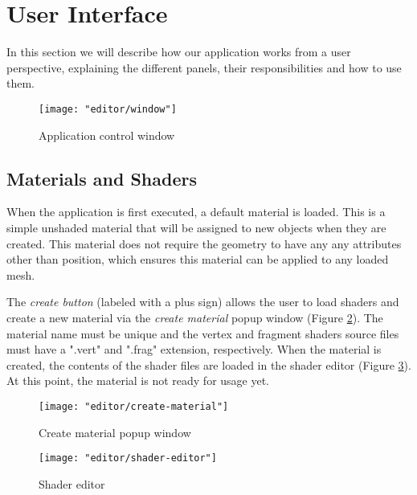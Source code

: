 \section{User Interface}
In this section we will describe how our application works from a user perspective, explaining the different panels, their responsibilities and how to use them.

\begin{figure}[ht]
    \caption{Application control window}
    \begin{center}
        \texttt{[image: "editor/window"]}
    \end{center}
    \label{fig:window}
\end{figure}


\subsection{Materials and Shaders}
When the application is first executed, a default material is loaded. This is a simple unshaded material that will be assigned to new objects when they are created. This material does not require the geometry to have any any attributes other than position, which ensures this material can be applied to any loaded mesh.

The \textit{create button} (labeled with a plus sign) allows the user to load shaders and create a new material via the \textit{create material} popup window (Figure \ref{fig:create-material}). The material name must be unique and the vertex and fragment shaders source files must have a ".vert" and ".frag" extension, respectively. When the material is created, the contents of the shader files are loaded in the shader editor (Figure \ref{fig:shader-editor}). At this point, the material is not ready for usage yet.

\begin{figure}[h]
    \caption{Create material popup window}
    \begin{center}
        \texttt{[image: "editor/create-material"]}
    \end{center}
    \label{fig:create-material}
\end{figure}

\begin{figure}
    \caption{Shader editor}
    \begin{center}
        \texttt{[image: "editor/shader-editor"]}
    \end{center}
    \label{fig:shader-editor}
\end{figure}

